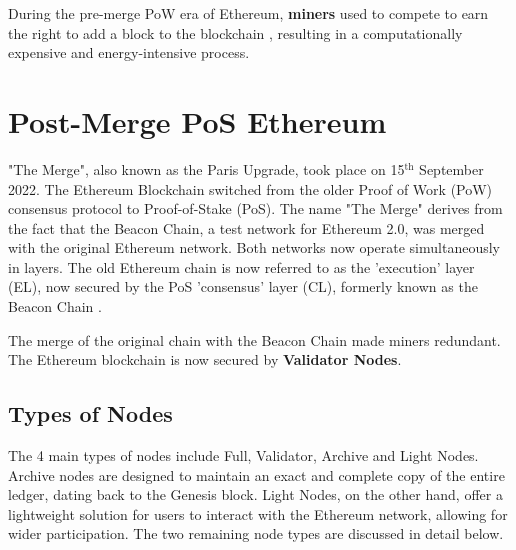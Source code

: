 
During the pre-merge PoW era of Ethereum, \textbf{miners} used to compete 
to earn the right to add a block to the blockchain 
, resulting in a computationally expensive and energy-intensive process.


\section{Post-Merge PoS Ethereum}

"The Merge", also known as the Paris Upgrade, took place on 15$\mathrm{^{th}}$ September 2022. The Ethereum Blockchain switched from the older Proof of Work (PoW) consensus protocol to Proof-of-Stake (PoS). The name "The Merge" derives from the fact that the Beacon Chain, a test network for Ethereum 2.0, was merged with the original Ethereum network. Both networks now operate simultaneously in layers. The old Ethereum chain is now referred to as the 'execution' layer (EL), now secured by the PoS 'consensus' layer (CL), formerly known as the Beacon Chain \cite{EthereumEthereum.org}. 

The merge of the original chain with the Beacon Chain made miners redundant. The Ethereum blockchain is now secured by \textbf{Validator Nodes}. 

\subsection{Types of Nodes}

The 4 main types of nodes include Full, Validator, Archive and Light Nodes. Archive nodes are designed to maintain an exact and complete copy of the entire ledger, dating back to the Genesis block. Light Nodes, on the other hand, offer a lightweight solution for users to interact with the Ethereum network, allowing for wider participation. The two remaining node types are discussed in detail below.


